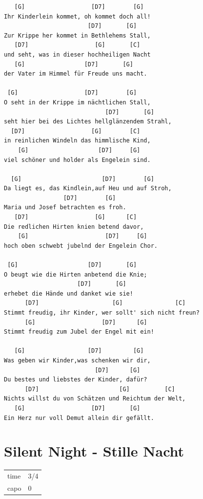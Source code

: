\documentclass[
]{book}
\let\stdsection\section
\renewcommand\section{\clearpage\stdsection}
\begin{document}
\begin{verbatim}
   [G]                   [D7]        [G]    
Ihr Kinderlein kommet, oh kommet doch all!
                        [D7]       [G]    
Zur Krippe her kommet in Bethlehems Stall,
   [D7]                   [G]       [C] 
und seht, was in dieser hochheiligen Nacht
   [G]                 [D7]       [G]  
der Vater im Himmel für Freude uns macht.

 [G]                   [D7]        [G]  
O seht in der Krippe im nächtlichen Stall,
                             [D7]       [G]    
seht hier bei des Lichtes hellglänzendem Strahl,
  [D7]                   [G]        [C]      
in reinlichen Windeln das himmlische Kind,
    [G]                    [D7]     [G] 
viel schöner und holder als Engelein sind.

  [G]                       [D7]        [G]   
Da liegt es, das Kindlein,auf Heu und auf Stroh,
                 [D7]        [G]    
Maria und Josef betrachten es froh.
   [D7]                   [G]      [C]     
Die redlichen Hirten knien betend davor,
    [G]                      [D7]     [G]    
hoch oben schwebt jubelnd der Engelein Chor.

 [G]                    [D7]       [G]   
O beugt wie die Hirten anbetend die Knie;
                     [D7]       [G]    
erhebet die Hände und danket wie sie!
      [D7]                     [G]               [C]     
Stimmt freudig, ihr Kinder, wer sollt' sich nicht freun?
      [G]                   [D7]      [G]        
Stimmt freudig zum Jubel der Engel mit ein!

   [G]                  [D7]         [G]   
Was geben wir Kinder,was schenken wir dir,
                          [D7]      [G]    
Du bestes und liebstes der Kinder, dafür?
      [D7]                       [G]          [C]        
Nichts willst du von Schätzen und Reichtum der Welt,
   [G]                   [D7]       [G]        
Ein Herz nur voll Demut allein dir gefällt.
\end{verbatim}

\hypertarget{weihnachten-silent-night}{%
\section{Silent Night - Stille Nacht}\label{weihnachten-silent-night}}

\begin{longtable}[]{@{}ll@{}}
\toprule
\endhead
time & 3/4\tabularnewline
capo & 0\tabularnewline
\bottomrule
\end{longtable}
\end{document}
